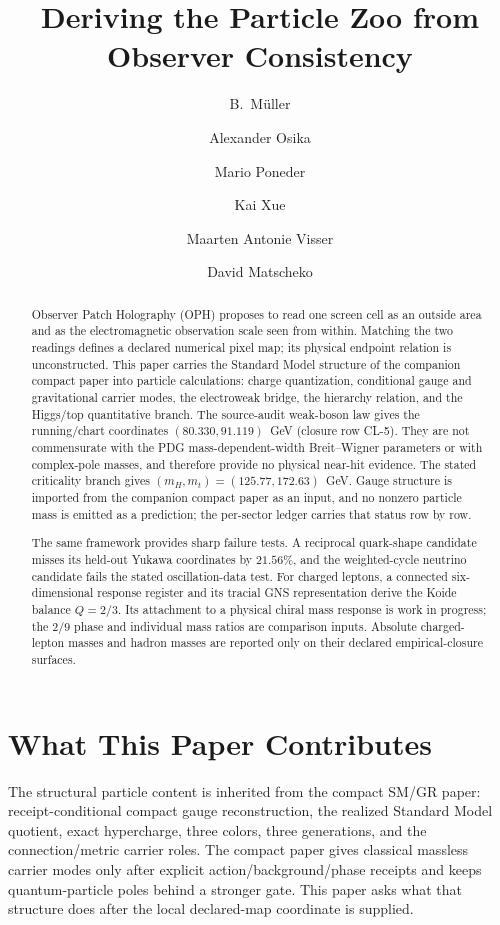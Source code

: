 \documentclass[11pt]{article}
\title{Deriving the Particle Zoo from\\
Observer Consistency}
\author{B.\ M\"uller \and Alexander Osika \and Mario Poneder \and Kai Xue \and Maarten Antonie Visser \and David Matscheko}
\date{\OPHPaperReleaseDate}
\begin{document}
\maketitle
\OPHPaperReleaseBanner

\begin{abstract}
Observer Patch Holography (OPH) proposes to read one screen cell as an outside area and as
the electromagnetic observation scale seen from within. Matching the two readings defines a
declared numerical pixel map; its physical endpoint relation is unconstructed. This paper carries the Standard
Model structure of the companion compact paper into particle calculations:
charge quantization, conditional gauge and gravitational carrier modes, the
electroweak bridge, the hierarchy relation, and the Higgs/top quantitative
branch. The source-audit weak-boson law gives the running/chart coordinates
\((80.330,91.119)\)~GeV (closure row CL-5). They are not commensurate with the
PDG mass-dependent-width Breit--Wigner parameters or with complex-pole masses, and therefore
provide no physical near-hit evidence. The stated criticality branch gives
\((m_H,m_t)=(125.77,172.63)\)~GeV. Gauge structure is imported from the
companion compact paper as an input, and no nonzero particle mass is
emitted as a prediction; the per-sector ledger carries that status row by row.

The same framework provides sharp failure tests. A reciprocal quark-shape
candidate misses its held-out Yukawa coordinates by \(21.56\%\), and the
weighted-cycle neutrino candidate fails the stated oscillation-data test. For
charged leptons, a connected six-dimensional response register and its
tracial GNS representation derive the Koide balance \(Q=2/3\). Its attachment
to a physical chiral mass response is work in progress; the \(2/9\) phase and
individual mass ratios are comparison inputs. Absolute charged-lepton masses
and hadron masses are reported only on their declared empirical-closure
surfaces.
\end{abstract}

\section*{What This Paper Contributes}

The structural particle content is inherited from the compact SM/GR paper: receipt-conditional compact gauge
reconstruction, the realized Standard Model quotient, exact hypercharge, three colors, three
generations, and the connection/metric carrier roles. The compact paper gives classical massless
carrier modes only after explicit action/background/phase receipts and keeps quantum-particle
poles behind a stronger gate. This paper asks what that structure does after the
local declared-map coordinate is supplied.
\end{document}
